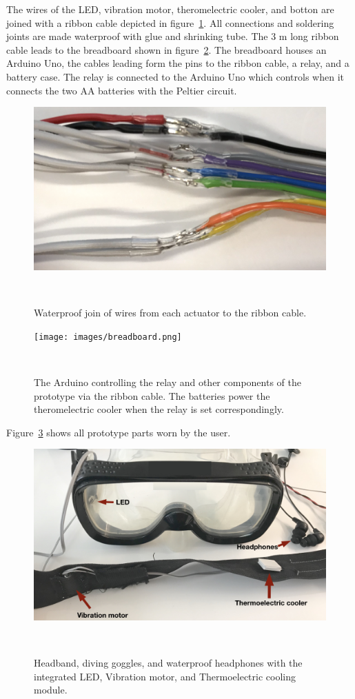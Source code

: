 The wires of the LED, vibration motor, theromelectric cooler, and botton are joined with a ribbon cable depicted in figure~\ref{fig:wires}.
All connections and soldering joints are made waterproof with glue and shrinking tube.
The  3 m long ribbon cable leads to the breadboard shown in figure~\ref{fig:breadboard}.
The breadboard houses an Arduino Uno, the cables leading form the pins to the ribbon cable, a relay, and a battery case.
The relay is connected to the Arduino Uno  which controls when it connects the two AA batteries with the Peltier circuit.


\begin{figure}
	\includegraphics[width= \textwidth]{images/wires.png}
	\caption{Waterproof join of wires from each actuator to the ribbon cable.}~\label{fig:wires}
\end{figure}

\begin{figure}
	\texttt{[image: images/breadboard.png]}
	\caption{The Arduino controlling the relay and other components of the prototype via the ribbon cable. The batteries power the theromelectric cooler when the relay is set correspondingly.}~\label{fig:breadboard}
\end{figure}


Figure~\ref{fig:studysetupcut} shows all prototype parts worn by the user.
 
\begin{figure}
	\includegraphics[width= \textwidth]{images/studysetupcut.png}
	\caption{Headband, diving goggles, and waterproof headphones with the integrated LED, Vibration motor, and Thermoelectric cooling module.}~\label{fig:studysetupcut}
\end{figure}


